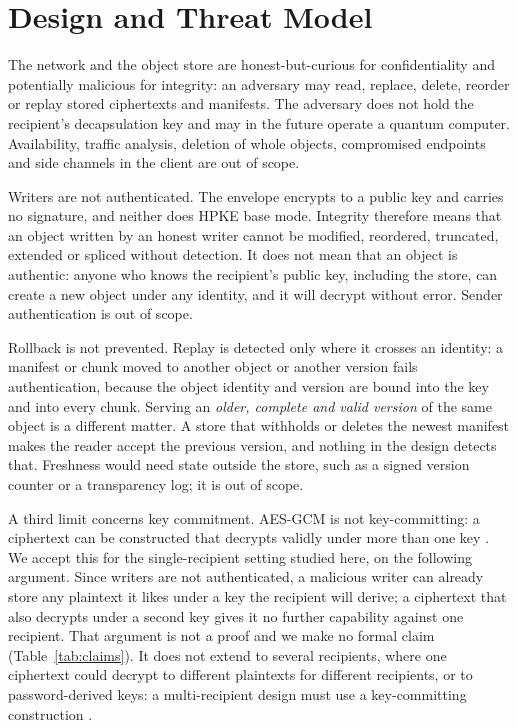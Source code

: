 \documentclass[review,12pt]{elsarticle}
\begin{document}
\section{Design and Threat Model}\label{sec:design}\label{sec:n1design}\label{sec:hpke}
The network and the object store are honest-but-curious for confidentiality and potentially
malicious for integrity: an adversary may read, replace, delete, reorder or replay stored
ciphertexts and manifests. The adversary does not hold the recipient's decapsulation key and may
in the future operate a quantum computer. Availability, traffic analysis, deletion of whole
objects, compromised endpoints and side channels in the client are out of scope.

Writers are not authenticated. The envelope encrypts to a public key and carries no
signature, and neither does HPKE base mode. Integrity therefore means that an object written
by an honest writer cannot be modified, reordered, truncated, extended or spliced without
detection. It does not mean that an object is authentic: anyone who knows the recipient's public
key, including the store, can create a new object under any identity, and it will decrypt
without error. Sender authentication is out of scope.

Rollback is not prevented. Replay is detected only where it crosses an identity: a
manifest or chunk moved to another object or another version fails authentication, because the
object identity and version are bound into the key and into every chunk. Serving an
\emph{older, complete and valid version} of the same object is a different matter. A store that
withholds or deletes the newest manifest makes the reader accept the previous version, and
nothing in the design detects that. Freshness would need state outside the store, such as a
signed version counter or a transparency log; it is out of scope.

A third limit concerns key commitment. AES-GCM is not key-committing: a ciphertext can be constructed that
decrypts validly under more than one key
\cite{dodis2018,len2021}.
We accept this for the single-recipient setting studied here, on the following argument. Since
writers are not authenticated, a malicious writer can already store any plaintext it likes
under a key the recipient will derive; a ciphertext that also decrypts under a second key gives
it no further capability against one recipient. That argument is not a proof and we make no
formal claim (Table~\ref{tab:claims}). It does not extend to several recipients, where one
ciphertext could decrypt to different plaintexts for different recipients, or to
password-derived keys: a multi-recipient design must use a
key-committing construction
\cite{albertini2022}.
\end{document}
